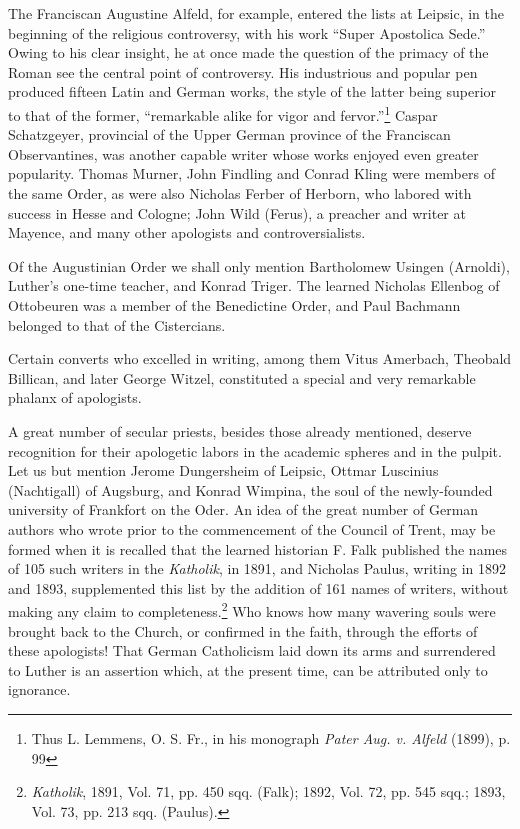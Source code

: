 The Franciscan Augustine Alfeld, for example, entered the lists
at Leipsic, in the beginning of the religious controversy, with his
work “Super Apostolica Sede.” Owing to his clear insight, he at once
made the question of the primacy of the Roman see the central point
of controversy. His industrious and popular pen produced fifteen
Latin and German works, the style of the latter being superior to
that of the former, “remarkable alike for vigor and fervor.”\footnote
{Thus L. Lemmens, O. S. Fr., in his monograph \textit{Pater Aug. v. Alfeld} (1899), p. 99}
Caspar Schatzgeyer, provincial of the Upper German province of the Franciscan
Observantines, was another capable writer whose works enjoyed
even greater popularity. Thomas Murner, John Findling and
Conrad Kling were members of the same Order, as were also Nicholas Ferber
of Herborn, who labored with success in Hesse and
Cologne; John Wild (Ferus), a preacher and writer at Mayence, and
many other apologists and controversialists.

Of the Augustinian Order we shall only mention Bartholomew
Usingen (Arnoldi), Luther’s one-time teacher, and Konrad Triger.
The learned Nicholas Ellenbog of Ottobeuren was a member of the
Benedictine Order, and Paul Bachmann belonged to that of the Cistercians.

Certain converts who excelled in writing, among them Vitus Amerbach, Theobald
Billican, and later George Witzel, constituted a special and very remarkable phalanx of apologists.

A great number of secular priests, besides those already mentioned,
deserve recognition for their apologetic labors in the academic spheres
and in the pulpit. Let us but mention Jerome Dungersheim of Leipsic,
Ottmar Luscinius (Nachtigall) of Augsburg, and Konrad Wimpina, the soul
of the newly-founded university of Frankfort on the
Oder. An idea of the great number of German authors who wrote
prior to the commencement of the Council of Trent, may be formed
when it is recalled that the learned historian F. Falk published the
names of 105 such writers in the \textit{Katholik}, in 1891, and Nicholas
Paulus, writing in 1892 and 1893, supplemented this list by the addition
of 161 names of writers, without making any claim to completeness.\footnote
{\textit{Katholik}, 1891, Vol. 71, pp. 450 sqq. (Falk); 1892, Vol. 72, pp. 545 sqq.; 1893, Vol.
73, pp. 213 sqq. (Paulus).}
Who knows how many wavering souls were brought
back to the Church, or confirmed in the faith, through the efforts of
these apologists! That German Catholicism laid down its arms and
surrendered to Luther is an assertion which, at the present time, can
be attributed only to ignorance.

